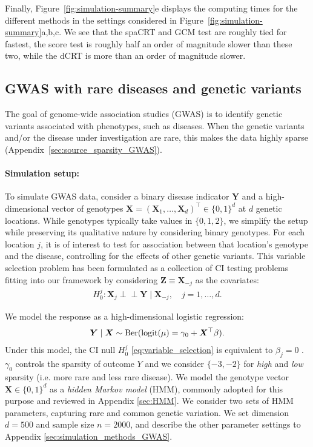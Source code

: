 \documentclass[12pt]{article}
\theoremstyle{definition}
\newcommand{\indep}{\perp \!\!\! \perp}
\newcommand{\prx}{\bm X}								%
\newcommand{\prz}{\bm Z}								%
\newcommand{\pry}{{\bm Y}}								%
\begin{document}
  
  Finally, Figure~\ref{fig:simulation-summary}e displays the computing times for the different methods in the settings considered in Figure~\ref{fig:simulation-summary}a,b,c. We see that the spaCRT and GCM test are roughly tied for fastest, the score test is roughly half an order of magnitude slower than these two, while the dCRT is more than an order of magnitude slower. 
  
  \subsection{GWAS with rare diseases and genetic variants}\label{sec:GWAS}

  The goal of genome-wide association studies (GWAS) is to identify genetic variants associated with phenotypes, such as diseases. When the genetic variants and/or the disease under investigation are rare, this makes the data highly sparse (Appendix~\ref{sec:source_sparsity_GWAS}).
  
  \paragraph{Simulation setup:}
  
  To simulate GWAS data, consider a binary disease indicator $\pry$ and a high-dimensional vector of genotypes $\prx=(\prx_1,\ldots,\prx_d)^\top\in\{0,1\}^d$ at $d$ genetic locations. While genotypes typically take values in $\{0,1,2\}$, we simplify the setup while preserving its qualitative nature by considering binary genotypes. For each location $j$, it is of interest to test for association between that location's genotype and the disease, controlling for the effects of other genetic variants. This variable selection problem has been formulated as a collection of CI testing problems \citep{sesia2019gene} fitting into our framework by considering $\prz\equiv \prx_{-j}$ as the covariates:
  \begin{align}\label{eq:variable_selection}
	H_0^j:\prx_j\indep \pry\mid \prx_{-j}, \quad j=1,\ldots,d.
  \end{align}

  We model the response as a high-dimensional logistic regression:
  \begin{align*}
	  \bm Y \mid \bm X\sim \textnormal{Ber}(\text{logit}(\mu) = \gamma_0 + \prx^\top \beta).
  \end{align*}
  Under this model, the CI null $H_0^j$ \eqref{eq:variable_selection} is equivalent to $\beta_j=0$ \citep{CetL16}. $\gamma_0$ controls the sparsity of outcome $Y$ and we consider $\{-3,-2\}$ for \textit{high} and \textit{low} sparsity (i.e. more rare and less rare disease). We model the genotype vector $\prx \in\{0,1\}^{d}$ as a \textit{hidden Markov model} (HMM), commonly adopted for this purpose \citep{scheet2006fast,marchini2007new,browning2007rapid} and reviewed in Appendix \ref{sec:HMM}. We consider two sets of HMM parameters, capturing rare and common genetic variation. We set dimension $d=500$ and sample size $n=2000$, and describe the other parameter settings to Appendix \ref{sec:simulation_methods_GWAS}. 
  
\end{document}
